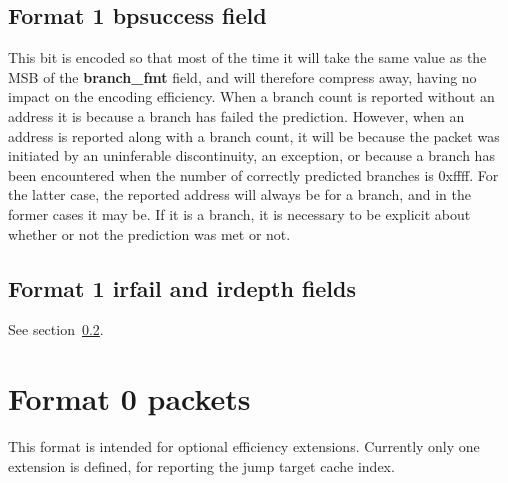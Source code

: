 \subsection{Format 1 \textbf{bpsuccess} field}
This bit is encoded so that most of the time it will take the same value as the MSB of the \textbf{branch\_fmt} field,
and will therefore compress away, having no impact on the encoding efficiency.  When a branch count is reported without 
an address it is because a branch has failed the prediction.  However, when an address is reported along with
a branch count, it will be because the packet was initiated by an uninferable discontinuity, an exception, or because a
branch has been encountered when the number of correctly predicted branches is 0xffff.  For the latter case, the 
reported address will always be for a branch, and in the former cases it may be.  If it is a branch, it is necessary to 
be explicit about whether or not the prediction was met or not.

\subsection{Format 1 \textbf{irfail} and \textbf{irdepth} fields} \label{sec:irxx}

See section~\ref{sec:irxx}.

\FloatBarrier
\section{Format 0 packets} \label{sec:format0}

This format is intended for optional efficiency extensions.  Currently only one extension is defined, for reporting
the jump target cache index.

